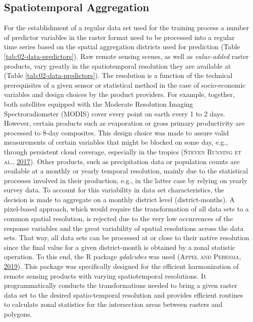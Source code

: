 \documentclass[a4paper,11pt]{article}
\begin{document}
\hypertarget{spatiotemporal-aggregation}{%
\subsection{Spatiotemporal Aggregation}\label{spatiotemporal-aggregation}}

For the establishment of a regular data set used for the training
process a number of predictor variables in the raster
format need to be processed into a regular time series based on the spatial aggregation
districts used for prediction (Table \ref{tab:02-data-predictors}). Raw remote
sensing scenes, as well as \emph{value-added} raster products, vary greatly in the
spatiotemporal resolution they are available at (Table \ref{tab:02-data-predictors}).
The resolution is a function of the technical prerequisites of a given sensor or
statistical method in the case of socio-economic variables and design choices by
the product providers. For example, together, both satellites equipped with the
Moderate Resolution Imaging Spectroradiometer (MODIS) cover every
point on earth every 1 to 2 days. However, certain products such as evaporation
or gross primary productivity are processed to 8-day composites. This design
choice was made to assure valid measurements of certain variables that might be
blocked on some day, e.g., through persistent cloud coverage, especially in the tropics \textsc{(\textnormal{\textsc{Steven Running} \textsc{et al.}}, \textnormal{\protect\hyperlink{ref-running2017}{2017}})}. Other products, such as precipitation data or population counts are available
at a monthly or yearly temporal resolution, mainly due to the statistical processes
involved in their production, e.g., in the latter case by relying on yearly survey
data. To account for this variability in data set characteristics, the decision
is made to aggregate on a monthly district level (district-months). A pixel-based
approach, which would require the transformation of all data sets to a common
spatial resolution, is rejected due to the very low occurrences of the response
variables and the great variability of spatial resolutions across the data sets.
That way, all data sets can be processed at or close to their native resolution
since the final value for a given district-month is obtained by a zonal statistic
operation. To this end, the R package \emph{gdalcubes} was used \textsc{(\textnormal{\textsc{Appel} and \textsc{Pebesma}}, \textnormal{\protect\hyperlink{ref-appel2019}{2019}})}. This
package was specifically designed for the efficient harmonization of remote sensing
products with varying spatiotemporal resolutions. It programmatically conducts the
transformations needed to bring a given raster data set to the desired spatio-temporal
resolution and provides efficient routines to calculate zonal statistics for the
intersection areas between rasters and polygons.
\end{document}
